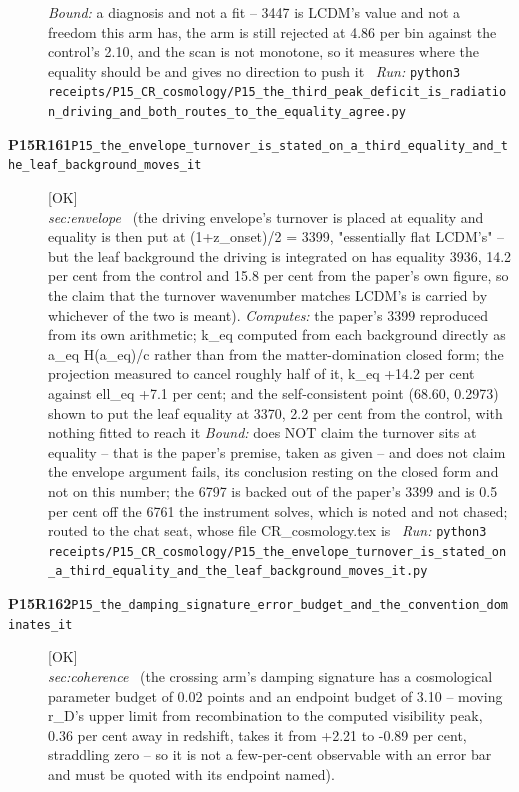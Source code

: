 \begin{description}
 \emph{Bound:} a diagnosis and not a fit -- 3447 is LCDM's value and not a freedom this arm has, the arm is still rejected at 4.86 per bin against the control's 2.10, and the scan is not monotone, so it measures where the equality should be and gives no direction to push it
\ \emph{Run:} \texttt{python3 receipts/P15\_CR\_cosmology/P15\_the\_third\_peak\_deficit\_is\_radiation\_driving\_and\_both\_routes\_to\_the\_equality\_agree.py}
\item[\rcptlabel{P15_the_envelope_turnover_is_stated_on_a_third_equality_and_the_leaf_background_moves_it}{P15R161}\textbf{P15R161}\quad\texttt{P15\_the\_envelope\_turnover\_is\_stated\_on\_a\_third\_equality\_and\_the\_leaf\_background\_moves\_it}]\hfill\textsf{[OK]}\\
\textit{sec:envelope} \ (the driving envelope's turnover is placed at equality and equality is then put at (1+z\_onset)/2 = 3399, "essentially flat LCDM's" -- but the leaf background the driving is integrated on has equality 3936, 14.2 per cent from the control and 15.8 per cent from the paper's own figure, so the claim that the turnover wavenumber matches LCDM's is carried by whichever of the two is meant). 
\emph{Computes:} the paper's 3399 reproduced from its own arithmetic; k\_eq computed from each background directly as a\_eq H(a\_eq)/c rather than from the matter-domination closed form; the projection measured to cancel roughly half of it, k\_eq +14.2 per cent against ell\_eq +7.1 per cent; and the self-consistent point (68.60, 0.2973) shown to put the leaf equality at 3370, 2.2 per cent from the control, with nothing fitted to reach it
 \emph{Bound:} does NOT claim the turnover sits at equality -- that is the paper's premise, taken as given -- and does not claim the envelope argument fails, its conclusion resting on the closed form and not on this number; the 6797 is backed out of the paper's 3399 and is 0.5 per cent off the 6761 the instrument solves, which is noted and not chased; routed to the chat seat, whose file CR\_cosmology.tex is
\ \emph{Run:} \texttt{python3 receipts/P15\_CR\_cosmology/P15\_the\_envelope\_turnover\_is\_stated\_on\_a\_third\_equality\_and\_the\_leaf\_background\_moves\_it.py}
\item[\rcptlabel{P15_the_damping_signature_error_budget_and_the_convention_dominates_it}{P15R162}\textbf{P15R162}\quad\texttt{P15\_the\_damping\_signature\_error\_budget\_and\_the\_convention\_dominates\_it}]\hfill\textsf{[OK]}\\
\textit{sec:coherence} \ (the crossing arm's damping signature has a cosmological parameter budget of 0.02 points and an endpoint budget of 3.10 -- moving r\_D's upper limit from recombination to the computed visibility peak, 0.36 per cent away in redshift, takes it from +2.21 to -0.89 per cent, straddling zero -- so it is not a few-per-cent observable with an error bar and must be quoted with its endpoint named). 

\end{description}

